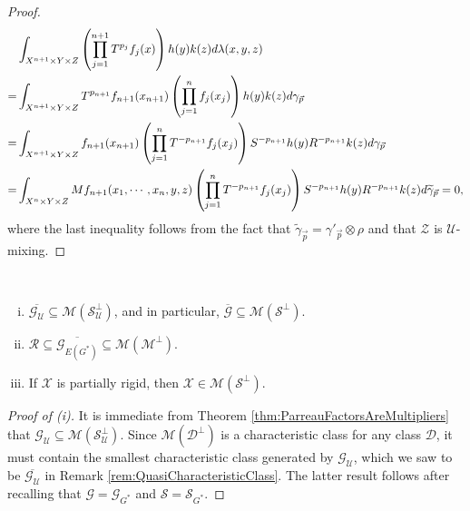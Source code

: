 \documentclass[graybox]{svmult}
\theoremstyle{definition}
\begin{document}
\begin{proof}
    \begin{alignat*}{2}
        &\int_{X^{n+1}\times Y\times Z}\left(\prod_{j = 1}^{n+1}T^{p_j}f_j(x)\right)h(y)k(z)d\lambda(x,y,z)\\
        =&\int_{X^{n+1}\times Y\times Z}T^{p_{n+1}}f_{n+1}(x_{n+1})\left(\prod_{j = 1}^nf_j(x_j)\right)h(y)k(z)d\gamma_{{\vec p}}\notag\\
        = &\int_{X^{n+1}\times Y\times Z}f_{n+1}(x_{n+1})\left(\prod_{j = 1}^nT^{-p_{n+1}}f_j(x_j)\right)S^{-p_{n+1}}h(y)R^{-p_{n+1}}k(z)d\gamma_{{\vec p}}\notag\\
        =& \int_{X^n\times Y\times Z}Mf_{n+1}(x_1,\cdots,x_n,y,z)\left(\prod_{j = 1}^nT^{-p_{n+1}}f_j(x_j)\right)S^{-p_{n+1}}h(y)R^{-p_{n+1}}k(z)d\widetilde{\gamma}_{{\vec p}} = 0,
    \end{alignat*}
    where the last inequality follows from the fact that $\widetilde{\gamma}_{{\vec p}} = \gamma'_{{\vec p}}\otimes\rho$ and that $\mathcal{Z}$ is $\mathcal{U}$-mixing.
\end{proof}

\begin{corollary}\label{cor:MainMultiplierResult}
    \ 
    \begin{enumerate}[(i)]
        \item $\overline{\mathcal{G}_\mathcal{U}} \subseteq \mathscr{M}(\mathcal{S}_\mathcal{U}^\perp)$, and in particular, $\overline{\mathcal{G}} \subseteq \mathscr{M}(\mathcal{S}^\perp)$.
        
        \item $\mathcal{R} \subseteq \overline{\mathcal{G}_{E(G^*)}} \subseteq \mathscr{M}(\mathcal{M}^\perp)$.

        \item If $\mathcal{X}$ is partially rigid, then $\mathcal{X} \in \mathscr{M}(\mathcal{S}^\perp)$.
    \end{enumerate}
\end{corollary}

\begin{proof}[Proof of (i)]
    It is immediate from Theorem \ref{thm:ParreauFactorsAreMultipliers} that $\mathcal{G}_\mathcal{U} \subseteq \mathscr{M}(\mathcal{S}_{\mathcal{U}}^\perp)$.
    Since $\mathscr{M}(\mathscr{D}^\perp)$ is a characteristic class for any class $\mathscr{D}$, it must contain the smallest characteristic class generated by $\mathcal{G}_\mathcal{U}$, which we saw to be $\overline{\mathcal{G}_{\mathcal{U}}}$ in Remark \ref{rem:QuasiCharacteristicClass}.
    The latter result follows after recalling that $\mathcal{G} = \mathcal{G}_{G^*}$ and $\mathcal{S} = \mathcal{S}_{G^*}$.
\end{proof}
\end{document}
